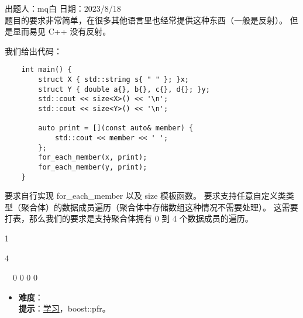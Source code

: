 出题人：mq白 日期：2023/8/18\\

题目的要求非常简单，在很多其他语言里也经常提供这种东西（一般是反射）。 但是显而易见 C++ 没有反射。

我们给出代码：

\begin{verbatim}
    int main() {
        struct X { std::string s{ " " }; }x;
        struct Y { double a{}, b{}, c{}, d{}; }y;
        std::cout << size<X>() << '\n';
        std::cout << size<Y>() << '\n';
    
        auto print = [](const auto& member) {
            std::cout << member << ' ';
        };
        for_each_member(x, print);
        for_each_member(y, print);
    }
\end{verbatim}

要求自行实现 for\_each\_member 以及 size 模板函数。 要求支持任意自定义类类型（聚合体）的数据成员遍历（聚合体中存储数组这种情况不需要处理）。 这需要打表，那么我们的要求是支持聚合体拥有 0 到 4 个数据成员的遍历。

\begin{tcolorbox}[title = {要求运行结果},
    fonttitle = \bfseries, fontupper = \sffamily, fontlower = \itshape]
    1           

    4           

    ~~0 0 0 0
\end{tcolorbox}

\begin{itemize}
\item \textbf{难度}：  \\
      \textbf{提示}：\href{https://akrzemi1.wordpress.com/2020/10/01/reflection-for-aggregates/}{学习}，boost::pfr。
\end{itemize}